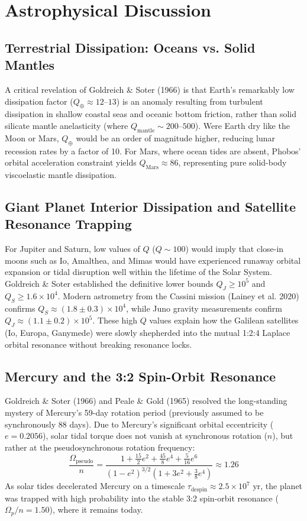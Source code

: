 \documentclass[11pt,a4paper]{article}
\begin{document}
\section{Astrophysical Discussion}

\subsection{Terrestrial Dissipation: Oceans vs. Solid Mantles}
A critical revelation of Goldreich \& Soter (1966) is that Earth's remarkably low dissipation factor ($Q_\oplus \approx 12$--$13$) is an anomaly resulting from turbulent dissipation in shallow coastal seas and oceanic bottom friction, rather than solid silicate mantle anelasticity (where $Q_{\text{mantle}} \sim 200$--$500$). Were Earth dry like the Moon or Mars, $Q_\oplus$ would be an order of magnitude higher, reducing lunar recession rates by a factor of 10. For Mars, where ocean tides are absent, Phobos' orbital acceleration constraint yields $Q_{\text{Mars}} \approx 86$, representing pure solid-body viscoelastic mantle dissipation.

\subsection{Giant Planet Interior Dissipation and Satellite Resonance Trapping}
For Jupiter and Saturn, low values of $Q$ ($Q \sim 100$) would imply that close-in moons such as Io, Amalthea, and Mimas would have experienced runaway orbital expansion or tidal disruption well within the lifetime of the Solar System. Goldreich \& Soter established the definitive lower bounds $Q_J \ge 10^5$ and $Q_S \ge 1.6 \times 10^4$. Modern astrometry from the Cassini mission (Lainey et al. 2020) confirms $Q_S \approx (1.8 \pm 0.3) \times 10^4$, while Juno gravity measurements confirm $Q_J \approx (1.1 \pm 0.2) \times 10^5$. These high $Q$ values explain how the Galilean satellites (Io, Europa, Ganymede) were slowly shepherded into the mutual 1:2:4 Laplace orbital resonance without breaking resonance locks.

\subsection{Mercury and the 3:2 Spin-Orbit Resonance}
Goldreich \& Soter (1966) and Peale \& Gold (1965) resolved the long-standing mystery of Mercury's 59-day rotation period (previously assumed to be synchronously 88 days). Due to Mercury's significant orbital eccentricity ($e = 0.2056$), solar tidal torque does not vanish at synchronous rotation ($n$), but rather at the pseudosynchronous rotation frequency:
\begin{equation}
\frac{\Omega_{\text{pseudo}}}{n} = \frac{1 + \frac{15}{2}e^2 + \frac{45}{8}e^4 + \frac{5}{16}e^6}{(1 - e^2)^{3/2} \left(1 + 3e^2 + \frac{3}{8}e^4\right)} \approx 1.26
\end{equation}
As solar tides decelerated Mercury on a timescale $\tau_{\text{despin}} \approx 2.5 \times 10^7\text{ yr}$, the planet was trapped with high probability into the stable 3:2 spin-orbit resonance ($\Omega_p / n = 1.50$), where it remains today.
\end{document}

